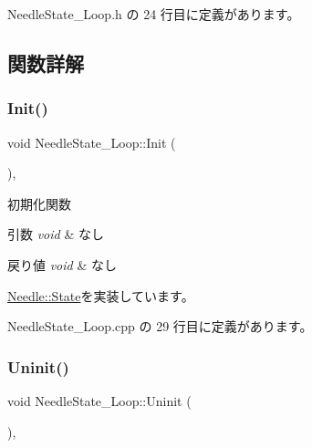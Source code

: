  Needle\+State\+\_\+\+Loop.\+h の 24 行目に定義があります。



\subsection{関数詳解}
\mbox{\label{class_needle_state___loop_a97f3190ebbbad2943e60f27588b2175d}} 
\subsubsection{\texorpdfstring{Init()}{Init()}}
{\footnotesize\ttfamily void Needle\+State\+\_\+\+Loop\+::\+Init (\begin{DoxyParamCaption}{ }\end{DoxyParamCaption})\hspace{0.3cm}{\ttfamily [override]}, {\ttfamily [virtual]}}



初期化関数 


\begin{DoxyParams}{引数}
{\em void} & なし \\
\hline
\end{DoxyParams}

\begin{DoxyRetVals}{戻り値}
{\em void} & なし \\
\hline
\end{DoxyRetVals}


\mbox{\hyperlink{class_needle_1_1_state_a0d1012f643be1fc3df2b977dc101fd6b}{Needle\+::\+State}}を実装しています。



 Needle\+State\+\_\+\+Loop.\+cpp の 29 行目に定義があります。

\mbox{\label{class_needle_state___loop_a059c3e62fde73c19292eb2510f4ab8fa}} 
\subsubsection{\texorpdfstring{Uninit()}{Uninit()}}
{\footnotesize\ttfamily void Needle\+State\+\_\+\+Loop\+::\+Uninit (\begin{DoxyParamCaption}{ }\end{DoxyParamCaption})\hspace{0.3cm}{\ttfamily [override]}, {\ttfamily [virtual]}}



